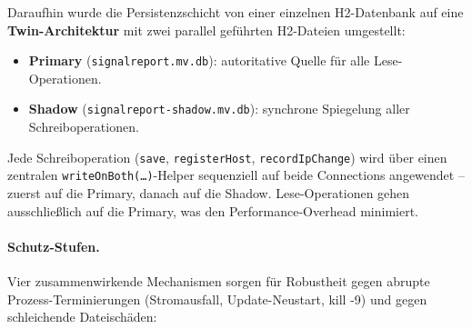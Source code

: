 Daraufhin wurde die Persistenzschicht von einer einzelnen H2-Datenbank auf eine
\textbf{Twin-Architektur} mit zwei parallel geführten H2-Dateien umgestellt:

\begin{itemize}
  \item \textbf{Primary} (\texttt{signalreport.mv.db}): autoritative Quelle für alle
    Lese-Operationen.
  \item \textbf{Shadow} (\texttt{signalreport-shadow.mv.db}): synchrone Spiegelung
    aller Schreiboperationen.
\end{itemize}

Jede Schreiboperation (\texttt{save}, \texttt{registerHost}, \texttt{recordIpChange})
wird über einen zentralen \texttt{writeOnBoth(\dots)}-Helper sequenziell auf beide
Connections angewendet -- zuerst auf die Primary, danach auf die Shadow. Lese-Operationen
gehen ausschließlich auf die Primary, was den Performance-Overhead minimiert.

\paragraph{Schutz-Stufen.} Vier zusammenwirkende Mechanismen sorgen für Robustheit
gegen abrupte Prozess-Terminierungen (Stromausfall, Update-Neustart, kill -9) und gegen
schleichende Dateischäden:

